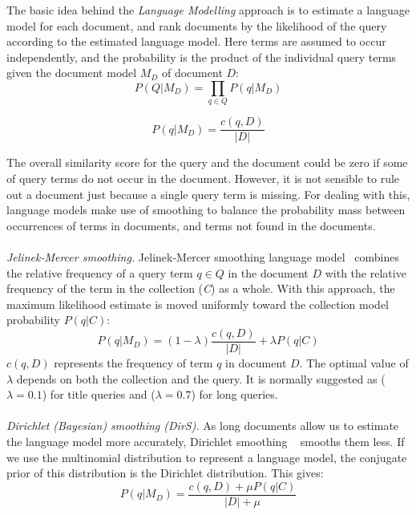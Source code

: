 The basic idea behind the \textit{Language Modelling} approach is to estimate a language model for each document, and rank documents by the likelihood of the query according to the estimated language model. Here terms are assumed to occur independently, and the probability is the product of the individual query terms given the document model $ M_{D} $ of document $ D $:
\begin{equation}
\label{eq:multinomial}
 P(Q|M_{D}) = \prod\limits_{q\in Q} P(q|M_{D}) 
\end{equation}

\begin{equation}
\label{eq:multinomial}
 P(q|M_{D}) = \frac{c(q,D)}{|D|}
\end{equation}

The overall similarity score for the query and the document could be zero if some of query terms do not occur in the document. However, it is not sensible to rule out a document just because a single query term is missing. For dealing with this, language models make use of smoothing to balance the probability mass between occurrences of terms in documents, and terms not found in the documents.
\\\\
\textit{Jelinek-Mercer smoothing.} Jelinek-Mercer smoothing language model~\citep{zhai2004study} combines the relative frequency of a query term $ q\in Q $ in the document $ D $ with the relative frequency of the term in the collection (\textit{C}) as a whole. With this approach, the maximum likelihood estimate is moved uniformly toward the collection model probability $ P(q|C) $:
\begin{equation}
P(q|M_{D}) = (1-\lambda)\frac{c(q,D)}{|D|}+\lambda P(q|C) 
\label{eq:jmsmoothing}
\end{equation} 
$ c(q,D) $ represents the frequency of term $ q $ in document $ D $. The optimal value of $ \lambda $ depends on both the collection and the query. It is normally suggested as ($ \lambda = 0.1$) for title queries and ($ \lambda = 0.7$) for long queries.
\\\\
\textit{Dirichlet (Bayesian) smoothing (DirS).} As long documents allow us to estimate the language model more accurately, Dirichlet smoothing ~\citep{zhai2004study} smooths them less. If we use the multinomial distribution to represent a language model, the conjugate prior of this distribution is the Dirichlet distribution. This gives:
\begin{equation}
\label{eq:bayessmoothing}
 P(q|M_{D}) = \frac{c(q,D) + \mu P(q|C)}{|D| + \mu}
\end{equation} 

